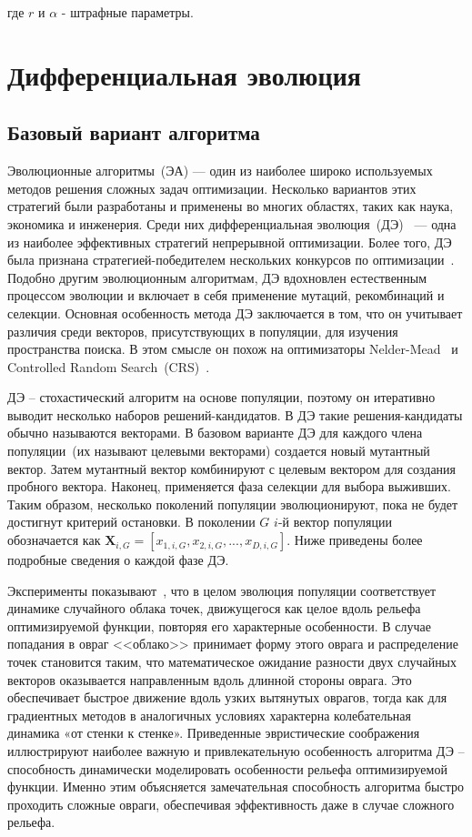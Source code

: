 \documentclass{llncs}
\begin{document}
где $r$ и $\alpha$ - штрафные параметры.

\section{Дифференциальная эволюция}\label{sec:sym:de}
\subsection{Базовый вариант алгоритма}\label{sec:sym:mod}

Эволюционные алгоритмы~(ЭА) — один из наиболее широко используемых методов решения сложных задач оптимизации. Несколько вариантов этих стратегий были разработаны и применены во многих областях, таких как наука, экономика и инженерия. Среди них дифференциальная эволюция~(ДЭ)~\cite{storn:de} — одна из наиболее эффективных стратегий непрерывной оптимизации. Более того, ДЭ была признана стратегией-победителем нескольких конкурсов по оптимизации~\cite{das:de}. Подобно другим эволюционным алгоритмам, ДЭ вдохновлен естественным процессом эволюции и включает в себя применение мутаций, рекомбинаций и селекции. Основная особенность метода ДЭ заключается в том, что он учитывает различия среди векторов, присутствующих в популяции, для изучения пространства поиска. В этом смысле он похож на оптимизаторы Nelder-Mead~\cite{nelder:simplex} и Controlled Random Search~(CRS)~\cite{price:global}.

ДЭ -- стохастический алгоритм на основе популяции, поэтому он итеративно выводит несколько наборов решений-кандидатов. В ДЭ такие решения-кандидаты обычно называются векторами. В базовом варианте ДЭ для каждого члена популяции~(их называют целевыми векторами) создается новый мутантный вектор. Затем мутантный вектор комбинируют с целевым вектором для создания пробного вектора. Наконец, применяется фаза селекции для выбора выживших. Таким образом, несколько поколений популяции эволюционируют, пока не будет достигнут критерий остановки. В поколении $G$ $i$-й вектор популяции обозначается как $\textbf{X}_{i,G} = [x_{1,i,G}, x_{2,i,G}, ..., x_{D,i,G}]$. Ниже приведены более подробные сведения о каждой фазе ДЭ.

Эксперименты показывают~\cite{storn:de_practical}, что в целом эволюция популяции соответствует динамике случайного облака точек, движущегося как целое вдоль рельефа оптимизируемой функции, повторяя его характерные особенности. В случае попадания в овраг <<облако>> принимает форму этого оврага и распределение точек становится таким, что математическое ожидание разности двух случайных векторов оказывается направленным вдоль длинной стороны оврага. Это обеспечивает быстрое движение вдоль узких вытянутых оврагов, тогда как для градиентных методов в аналогичных условиях характерна колебательная динамика «от стенки к стенке». Приведенные эвристические соображения иллюстрируют наиболее важную и привлекательную особенность алгоритма ДЭ -- способность динамически моделировать особенности рельефа оптимизируемой функции. Именно этим объясняется замечательная способность алгоритма быстро проходить сложные овраги, обеспечивая эффективность даже в случае сложного рельефа.
\end{document}
